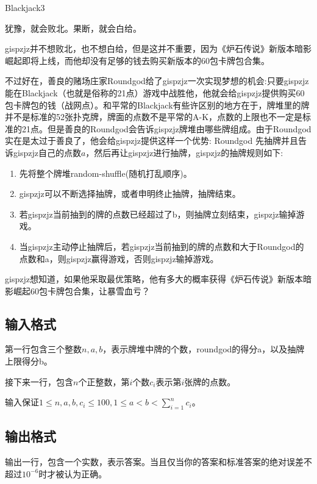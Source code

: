 \begin{Problem}{Blackjack}{3}

犹豫，就会败北。果断，就会白给。

gispzjz并不想败北，也不想白给，但是这并不重要，因为《炉石传说》新版本暗影崛起即将上线，而他却没有足够的钱去购买新版本的60包卡牌包合集。

不过好在，善良的赌场庄家Roundgod给了gispzjz一次实现梦想的机会:只要gispzjz能在Blackjack（也就是俗称的21点）游戏中战胜他，他就会给gispzjz提供购买60包卡牌包的钱（战网点）。和平常的Blackjack有些许区别的地方在于，牌堆里的牌并不是标准的52张扑克牌，牌面的点数不是平常的A-K，点数的上限也不一定是标准的21点。但是善良的Roundgod会告诉gispzjz牌堆由哪些牌组成。由于Roundgod实在是太过于善良了，他会给gispzjz提供这样一个优势: Roundgod 先抽牌并且告诉gispzjz自己的点数$a$，然后再让gispzjz进行抽牌，gispzjz的抽牌规则如下:

\begin{enumerate}
\item 先将整个牌堆random-shuffle(随机打乱顺序)。
\item gispzjz可以不断选择抽牌，或者申明终止抽牌，抽牌结束。
\item 若gispzjz当前抽到的牌的点数已经超过了b，则抽牌立刻结束，gispzjz输掉游戏。
\item 当gispzjz主动停止抽牌后，若gispzjz当前抽到的牌的点数和大于Roundgod的点数和a，则gispzjz赢得游戏，否则gispzjz输掉游戏。
\end{enumerate}

gispzjz想知道，如果他采取最优策略，他有多大的概率获得《炉石传说》新版本暗影崛起60包卡牌包合集，让暴雪血亏？

\subsection*{输入格式}

第一行包含三个整数$n,a,b$，表示牌堆中牌的个数，roundgod的得分a，以及抽牌上限得分b。

接下来一行，包含$n$个正整数，第$i$个数$c_i$表示第$i$张牌的点数。

输入保证$1 \leq n,a,b,c_i \leq 100, 1 \leq a < b < \sum_{i=1}^n c_i$。

\subsection*{输出格式}

输出一行，包含一个实数，表示答案。当且仅当你的答案和标准答案的绝对误差不超过$10^{-6}$时才被认为正确。


\end{Problem}
